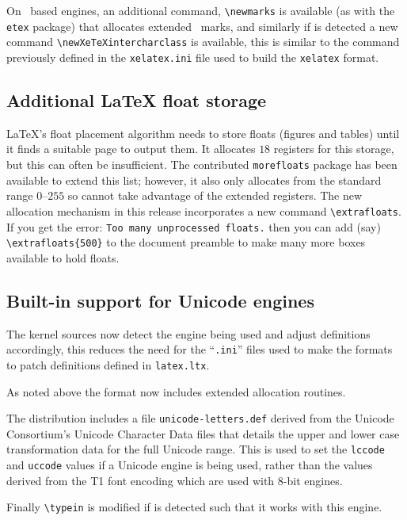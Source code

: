\documentclass{ltnews}
\providecommand\pkg[1]{\texttt{#1}}
\providecommand\file[1]{\texttt{#1}}
\begin{document}
On \eTeX\ based engines, an additional command, \verb|\newmarks| is available
(as with the \pkg{etex} package) that allocates extended \eTeX\ marks, and
similarly if  is detected a new command
\verb|\newXeTeXintercharclass| is available, this is similar to the command
previously defined in the \file{xelatex.ini} file used to build the
\texttt{xelatex} format.

\subsection{Additional \LaTeX{} float storage}

\LaTeX's float placement algorithm needs to store floats (figures and tables)
until it finds a suitable page to output them. It allocates $18$ registers for
this storage, but this can often be insufficient.
 The contributed \pkg{morefloats} package has
been available to extend this list; however, it also only allocates from the
standard range $0$--$255$ so cannot take advantage of the extended registers.
The new allocation mechanism in this release incorporates a new command
\verb|\extrafloats|. If you get the error:
\mbox{\texttt{Too many unprocessed floats.}}
then you can add (say) \verb|\extrafloats{500}| to the document preamble to
make many more boxes available to hold floats.


\subsection{Built-in support for Unicode engines}

The kernel sources now detect the engine being used and adjust definitions
accordingly, this reduces the need for the ``\texttt{.ini}'' files used to make
the formats to patch definitions defined in \file{latex.ltx}.

As noted above the format now includes extended allocation routines.

The distribution includes a file \file{unicode-letters.def} derived from the
Unicode Consortium's Unicode Character Data files that details the upper and
lower case transformation data for the full Unicode range. This is used to set
the \verb|lccode| and \verb|uccode| values if a Unicode engine is being used,
rather than the values derived from the T1 font encoding which are used with
8-bit engines.

Finally \verb|\typein| is modified if  is detected
such that it works with this engine.
\end{document}
